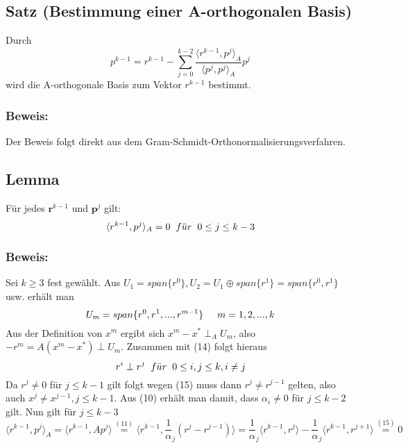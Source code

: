 \documentclass{article}
\begin{document}
\subsection{Satz (Bestimmung einer A-orthogonalen Basis)}
Durch
\begin{equation}
p^{k-1} = r^{k-1} - \sum_{j=0}^{k-2} \frac {\langle r^{k-1}, p^{j} \rangle _{A}} {\langle p^{j}, p^{j} \rangle _{A}} p^{j}
\end{equation}
wird die A-orthogonale Basis zum Vektor $r^{k-1}$ bestimmt.

\subsubsection{Beweis:}
Der Beweis folgt direkt aus dem Gram-Schmidt-Orthonormalisierungsverfahren.

\subsection{Lemma}
Für jedes $\textbf{r}^{k-1}$ und $\textbf{p}^{j}$ gilt:
\begin{equation*}
\langle r^{k-1}, p^{j} \rangle _{A} = 0 \hspace{2mm} f\ddot{u}r \hspace{2mm} 0 \le j \le k-3
\end{equation*}

\subsubsection{Beweis:}
Sei $k \ge 3$ fest gewählt. Aus $U_{1} = span\{r^{0}\}, U_{2} = U_{1} \oplus span\{r^{1}\} = span\{r^{0}, r^{1}\}$ usw. erhält man
\begin{equation}
U_{m} = span\{r^{0}, r^{1},...,r^{m-1}\} \hspace{5mm} m = 1,2,...,k
\end{equation}
Aus der Definition von $x^{m}$ ergibt sich $x^{m} - x^{*} \perp_{A} U_{m}$, also $-r^{m} = A(x^{m} - x^{*}) \perp U_{m}$. Zusammen mit (14) folgt hieraus
\begin{equation}
r^{i} \perp r^{j} \hspace{2mm} f\ddot{u}r \hspace{2mm} 0 \le i,j \le k, i \ne j
\end{equation}
Da $r^{j} \ne 0$ für $j \le k-1$ gilt folgt wegen (15) muss dann $r^{j} \ne r^{j-1}$ gelten, also auch $x^{j} \ne x^{j-1}, j \le k-1$. Aus (10) erhält man damit,
dass $\alpha_{i} \ne 0$ für $j \le k-2$ gilt. Nun gilt für $j \le k-3$
\begin{equation*}
\langle r^{k-1}, p^{j} \rangle _{A} =
\langle r^{k-1}, Ap^{j} \rangle \overset{(11)}{=} \langle r^{k-1}, {\frac 1 \alpha_{j} (r^{j} - r^{j-1})} \rangle =
\frac 1 \alpha_{j} \langle r^{k-1}, r^{j} \rangle - \frac 1 \alpha_{j} \langle r^{k-1}, r^{j+1} \rangle \overset{(15)}{=} 0
\end{equation*}
\end{document}
